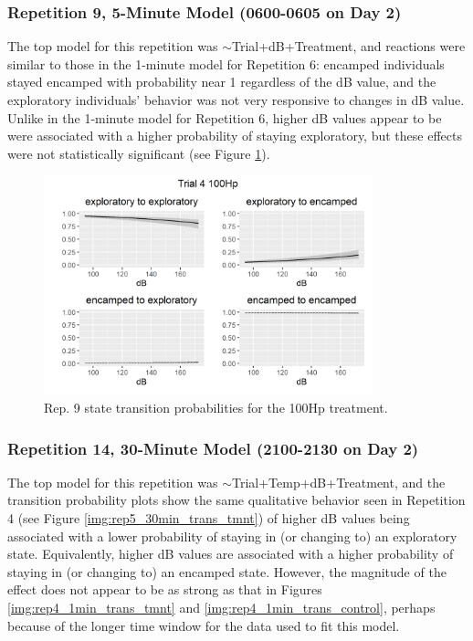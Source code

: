 \documentclass[12pt]{article}
\begin{document}
	\subsubsection{Repetition 9, 5-Minute Model (0600-0605 on Day 2)}
	
	The top model for this repetition was $\sim$Trial+dB+Treatment, and reactions were similar to those in the 1-minute model for Repetition 6: encamped individuals stayed encamped with probability near 1 regardless of the dB value, and the exploratory individuals' behavior was not very responsive to changes in dB value. Unlike in the 1-minute model for Repetition 6, higher dB values appear to be were associated with a higher probability of staying exploratory, but these effects were not statistically significant (see Figure \ref{img:rep9_5min_trans_tmnt}).
	
	\begin{figure}
		\centering
		\includegraphics[width=0.85\textwidth]{trans_rep_9_trial_4_100Hp.png}
		\caption{Rep. 9 state transition probabilities for the 100Hp treatment.}
		\label{img:rep9_5min_trans_tmnt}				
	\end{figure}
	
	
	\subsubsection{Repetition 14, 30-Minute Model (2100-2130 on Day 2)}
	
	The top model for this repetition was $\sim$Trial+Temp+dB+Treatment, and the transition probability plots show the same qualitative behavior seen in Repetition 4 (see Figure \ref{img:rep5_30min_trans_tmnt}) of higher dB values being associated with a lower probability of staying in (or changing to) an exploratory state. Equivalently, higher dB values are associated with a higher probability of staying in (or changing to) an encamped state. However, the magnitude of the effect does not appear to be as strong as that in Figures \ref{img:rep4_1min_trans_tmnt} and \ref{img:rep4_1min_trans_control}, perhaps because of the longer time window for the data used to fit this model.
	
\end{document}
